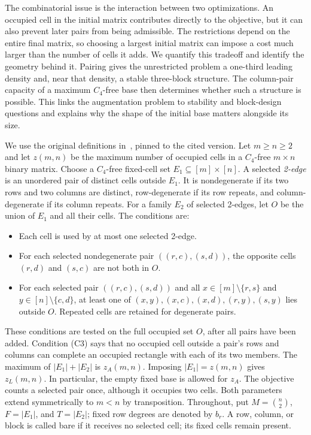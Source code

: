 \documentclass[11pt]{article}
\newcommand{\za}{z_A}
\newcommand{\zl}{z_L}
\begin{document}
The combinatorial issue is the interaction between two optimizations.
An occupied cell in the initial matrix contributes directly to the
objective, but it can also prevent later pairs from being admissible.
The restrictions depend on the entire final matrix, so choosing a largest
initial matrix can impose a cost much larger than the number of cells it
adds. We quantify this tradeoff and identify the geometry behind it.
Pairing gives the unrestricted problem a one-third leading density and,
near that density, a stable three-block structure. The column-pair
capacity of a maximum $C_4$-free
base then determines whether such a structure is possible. This links
the augmentation problem to stability and block-design questions and
explains why the shape of the initial base matters alongside its size.

We use the original definitions in~\cite[Section 2]{framework}, pinned
to the cited version. Let $m\ge n\ge2$ and let $z(m,n)$ be the maximum
number of occupied cells in a $C_4$-free $m\times n$ binary matrix.
Choose a $C_4$-free fixed-cell set $E_1\subseteq[m]\times[n]$.
A selected \emph{2-edge} is an unordered pair of distinct cells outside
$E_1$. It is nondegenerate if its two rows and two columns are distinct,
row-degenerate if its row repeats, and column-degenerate if its column repeats.
For a family $E_2$ of selected 2-edges, let $O$ be the union of $E_1$
and all their cells. The conditions are:
\begin{itemize}
\item[(S)] Each cell is used by at most one selected 2-edge.
\item[(C2)] For each selected nondegenerate pair $((r,c),(s,d))$,
the opposite cells $(r,d)$ and $(s,c)$ are not both in $O$.
\item[(C3)] For each selected pair $((r,c),(s,d))$ and all
$x\in[m]\setminus\{r,s\}$ and $y\in[n]\setminus\{c,d\}$,
at least one of $(x,y),(x,c),(x,d),(r,y),(s,y)$ lies outside $O$.
Repeated cells are retained for degenerate pairs.
\end{itemize}
These conditions are tested on the full occupied set $O$, after all pairs
have been added. Condition (C3) says that no occupied cell outside a pair's
rows and columns can complete an occupied rectangle with each of its two
members.
The maximum of $|E_1|+|E_2|$ is $\za(m,n)$.
Imposing $|E_1|=z(m,n)$ gives $\zl(m,n)$.
In particular, the empty fixed base is allowed for $\za$.
The objective counts a selected pair once, although it occupies two cells.
Both parameters extend symmetrically to $m<n$ by transposition.
Throughout, put $M=\binom n2$, $F=|E_1|$, and $T=|E_2|$;
fixed row degrees are denoted by $b_r$.
A row, column, or block is called bare if it receives no selected cell;
its fixed cells remain present.
\end{document}

